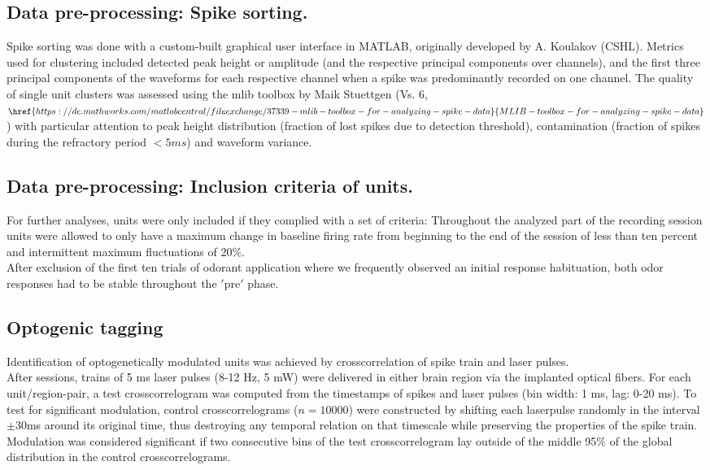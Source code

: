 \subsection{Data pre-processing: Spike sorting.} Spike sorting was done with a custom-built graphical user interface in MATLAB, originally developed by A. Koulakov (CSHL). Metrics used for clustering included detected peak height or amplitude (and the respective principal components over channels), and the first three principal components of the waveforms for each respective channel when a spike was predominantly recorded on one channel. The quality of single unit clusters was assessed using the mlib toolbox by Maik Stuettgen (Vs. 6, $\href{https://de.mathworks.com/matlabcentral/fileexchange/37339-mlib-toolbox-for-analyzing-spike-data}{MLIB-toolbox-for-analyzing-spike-data}$) with particular attention to peak height distribution (fraction of lost spikes due to detection threshold), contamination (fraction of spikes during the refractory period $<5ms$) and waveform variance.\\
\subsection{Data pre-processing: Inclusion criteria of units.} For further analyses, units were only included if they complied with a set of criteria: Throughout the analyzed part of the recording session units were allowed to only have a maximum change in baseline firing rate from beginning to the end of the session of less than ten percent and intermittent maximum fluctuations of 20$\%$.\\ After exclusion of the first ten trials of odorant application where we frequently observed an initial response habituation, both odor responses had to be stable throughout the $'$pre$'$ phase.
\subsection{Optogenic tagging}
Identification of optogenetically modulated units was achieved by crosscorrelation of spike train and laser pulses.\\
After sessions, trains of 5 ms laser pulses (8-12 Hz, 5 mW) were delivered in either brain region via the implanted optical fibers. For each unit/region-pair, a test crosscorrelogram was computed from the timestamps of spikes and laser pulses (bin width: 1 ms, lag:  0-20 ms). To test for significant modulation, control crosscorrelograms ($n = 10000$) were constructed by shifting each laserpulse randomly in the interval $\pm$30ms around its original time, thus destroying any temporal relation on that timescale while preserving the properties of the spike train. Modulation was considered significant if two consecutive bins of the test crosscorrelogram lay outside of the middle 95$\%$ of the global distribution in the control crosscorrelograms. 
